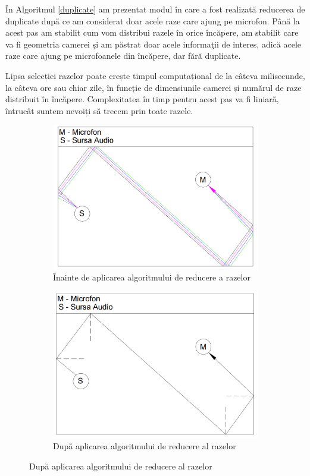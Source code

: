 	\^{I}n Algoritmul \ref{duplicate} am prezentat modul \^{i}n care a fost realizat\u{a} reducerea de duplicate dup\u{a} ce am considerat doar acele raze care ajung pe microfon. P\^{a}n\u{a} la acest pas am stabilit cum vom distribui razele \^{i}n orice \^{i}nc\u{a}pere, am stabilit care va fi geometria camerei \c{s}i am p\u{a}strat doar acele informa\c{t}ii de interes, adic\u{a} acele raze care ajung pe microfoanele din \^{i}nc\u{a}pere, dar f\u{a}r\u{a} duplicate. 
	
	Lipsa selecției razelor poate crește timpul computațional de la câteva milisecunde, la câteva ore sau chiar zile, în funcție de dimensiunile camerei și numărul de raze distribuit în încăpere. Complexitatea în timp pentru acest pas va fi liniară, întrucât suntem nevoiți să trecem prin toate razele.
	
	\begin{figure}[!htb]%
		\begin{subfigure}[b]{.49\textwidth}
			\centering
			\includegraphics[width=1.01\linewidth]{imagini/multipleRays.png} 
			\caption{Înainte de aplicarea algoritmului de reducere a razelor}
			\label{fig:sub-fig2}
		\end{subfigure}
		\hfill
		\begin{subfigure}[b]{.49\textwidth}
			\centering
			\includegraphics[width=1\linewidth]{imagini/oneRay.png}
			\caption{După aplicarea algoritmului de reducere al razelor}
			\label{fig:sub-second2}
		\end{subfigure}
		

\end{figure}
